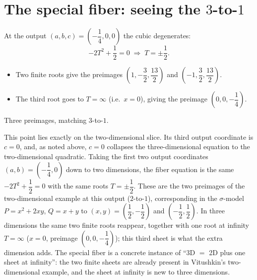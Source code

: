 \documentclass[11pt]{article}
\theoremstyle{plain}
\theoremstyle{definition}
\begin{document}
\section*{The special fiber: seeing the $3$-to-$1$}
At the output $(a,b,c)=\left(-\dfrac14,0,0\right)$ the cubic degenerates:
\[
  -2T^2+\frac12=0 \;\Longrightarrow\; T=\pm\frac12 .
\]
\begin{itemize}[nosep]
  \item Two finite roots give the preimages
        $\left(1,-\dfrac32,\dfrac{13}{2}\right)$ and
        $\left(-1,\dfrac32,\dfrac{13}{2}\right)$.
  \item The third root goes to $T=\infty$ (i.e.\ $x=0$), giving the preimage
        $\left(0,0,-\dfrac14\right)$.
\end{itemize}
Three preimages, matching $3$-to-$1$.

This point lies exactly on the two-dimensional slice. Its third output
coordinate is $c=0$, and, as noted above, $c=0$ collapses the
three-dimensional equation to the two-dimensional quadratic. Taking the first
two output coordinates $(a,b)=\left(-\dfrac14,0\right)$ down to two
dimensions, the fiber equation is the same $-2T^2+\dfrac12=0$ with the same
roots $T=\pm\dfrac12$. These are the two preimages of the two-dimensional
example at this output ($2$-to-$1$), corresponding in the $\sigma$-model
$P=x^2+2xy$, $Q=x+y$ to $(x,y)=\left(\dfrac12,-\dfrac12\right)$ and
$\left(-\dfrac12,\dfrac12\right)$. In three dimensions the same two finite
roots reappear, together with one root at infinity $T=\infty$ ($x=0$,
preimage $\left(0,0,-\dfrac14\right)$); this third sheet is what the extra
dimension adds. The special fiber is a concrete instance of ``3D $=$ 2D plus one
sheet at infinity'': the two finite sheets are already present in Vitushkin's
two-dimensional example, and the sheet at infinity is new to three
dimensions.

\end{document}

